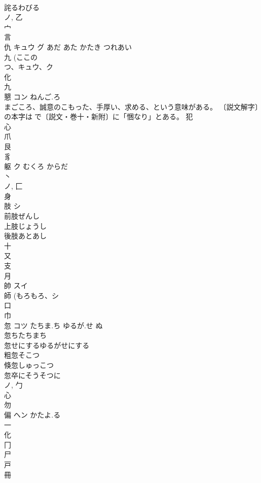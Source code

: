 \documentclass[8pt]{extreport}
\begin{document}
\begin{CJK}{UTF8}{min}
\\	詫るわびる
\\	ノ, 乙 
\\	宀 
\\	言 
\\	仇	キュウ グ	あだ あた かたき つれあい	
\\	九 (ここの
\\	つ、キュウ、ク 
\\	化 
\\	九 
\\	懇	コン	ねんご.ろ	
\\	まごころ、誠意のこもった、手厚い、求める、という意味がある。 〔説文解字〕の本字は𢡆で〔説文・巻十・新附〕に「悃なり」とある。			犯 
\\	心 
\\	爪 
\\	艮 
\\	豸 
\\	躯	ク	むくろ からだ	
\\	丶 
\\	ノ, 匚 
\\	身 
\\	肢	シ		
\\	前肢ぜんし
\\	上肢じょうし
\\	後肢あとあし
\\	十 
\\	又 
\\	支 
\\	月 
\\	帥	スイ		
\\	師 (もろもろ、シ 
\\	口 
\\	巾 
\\	忽	コツ	たちま.ち ゆるが.せ ぬ	
\\	忽ちたちまち 
\\	忽せにするゆるがせにする 
\\	粗忽そこつ 
\\	倏忽しゅっこつ 
\\	忽卒にそうそつに 
\\	ノ, 勹 
\\	心 
\\	勿 
\\	偏	ヘン	かたよ.る	
\\	一 
\\	化 
\\	冂 
\\	尸 
\\	戸 
\\	冊 

\end{CJK}
\end{document}
